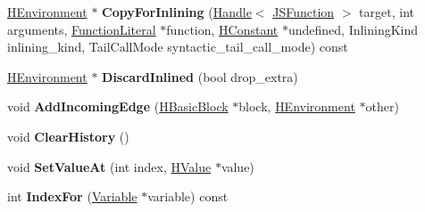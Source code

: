\begin{DoxyCompactItemize}
\item 
\hyperlink{classv8_1_1internal_1_1_h_environment}{H\+Environment} $\ast$ {\bfseries Copy\+For\+Inlining} (\hyperlink{classv8_1_1internal_1_1_handle}{Handle}$<$ \hyperlink{classv8_1_1internal_1_1_j_s_function}{J\+S\+Function} $>$ target, int arguments, \hyperlink{classv8_1_1internal_1_1_function_literal}{Function\+Literal} $\ast$function, \hyperlink{classv8_1_1internal_1_1_h_constant}{H\+Constant} $\ast$undefined, Inlining\+Kind inlining\+\_\+kind, Tail\+Call\+Mode syntactic\+\_\+tail\+\_\+call\+\_\+mode) const \hypertarget{classv8_1_1internal_1_1_h_environment_a29ba8b12ef5f084dc099a40ec26d7d7b}{}\label{classv8_1_1internal_1_1_h_environment_a29ba8b12ef5f084dc099a40ec26d7d7b}

\item 
\hyperlink{classv8_1_1internal_1_1_h_environment}{H\+Environment} $\ast$ {\bfseries Discard\+Inlined} (bool drop\+\_\+extra)\hypertarget{classv8_1_1internal_1_1_h_environment_a133295487c3cc2a155f174d8cbb52d4f}{}\label{classv8_1_1internal_1_1_h_environment_a133295487c3cc2a155f174d8cbb52d4f}

\item 
void {\bfseries Add\+Incoming\+Edge} (\hyperlink{classv8_1_1internal_1_1_h_basic_block}{H\+Basic\+Block} $\ast$block, \hyperlink{classv8_1_1internal_1_1_h_environment}{H\+Environment} $\ast$other)\hypertarget{classv8_1_1internal_1_1_h_environment_aaeaf9e9601739497bc020227cfb187ef}{}\label{classv8_1_1internal_1_1_h_environment_aaeaf9e9601739497bc020227cfb187ef}

\item 
void {\bfseries Clear\+History} ()\hypertarget{classv8_1_1internal_1_1_h_environment_ae040bc8c83d38139846c0777b3ec8c5c}{}\label{classv8_1_1internal_1_1_h_environment_ae040bc8c83d38139846c0777b3ec8c5c}

\item 
void {\bfseries Set\+Value\+At} (int index, \hyperlink{classv8_1_1internal_1_1_h_value}{H\+Value} $\ast$value)\hypertarget{classv8_1_1internal_1_1_h_environment_a7334a692d00080a5f677596b3ec9f029}{}\label{classv8_1_1internal_1_1_h_environment_a7334a692d00080a5f677596b3ec9f029}

\item 
int {\bfseries Index\+For} (\hyperlink{classv8_1_1internal_1_1_variable}{Variable} $\ast$variable) const \hypertarget{classv8_1_1internal_1_1_h_environment_af8bfa97ac8f61412644cb346bab56040}{}\label{classv8_1_1internal_1_1_h_environment_af8bfa97ac8f61412644cb346bab56040}


\end{DoxyCompactItemize}
